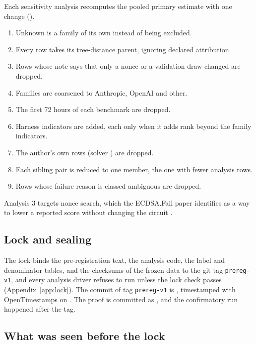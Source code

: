 Each sensitivity analysis recomputes the pooled primary estimate with one change ().
\begin{enumerate}
  \item Unknown is a family of its own instead of being excluded.
  \item Every row takes its tree-distance parent, ignoring declared attribution.
  \item Rows whose note says that only a nonce or a validation draw changed are dropped.
  \item Families are coarsened to Anthropic, OpenAI and other.
  \item The first 72 hours of each benchmark are dropped.
  \item Harness indicators are added, each only when it adds rank beyond the family indicators.
  \item The author's own rows (solver ) are dropped.
  \item Each sibling pair is reduced to one member, the one with fewer analysis rows.
  \item Rows whose failure reason is classed ambiguous are dropped.
\end{enumerate}
Analysis 3 targets nonce search, which the ECDSA.Fail paper identifies as a way to lower a reported score without changing the circuit \citep[\S6]{long2026ecdsafail}.

\subsection{Lock and sealing}
\label{sec:lock}

The lock binds the pre-registration text, the analysis code, the label and denominator tables, and the checksums of the frozen data to the git tag \texttt{prereg-v1}, and every analysis driver refuses to run unless the lock check passes (Appendix~\ref{app:lock}).
The commit of tag \texttt{prereg-v1} is \PreregTag{}, timestamped with OpenTimestamps \citep{opentimestamps} on \PreregOTSDate{}.
The proof is committed as , and the confirmatory run happened after the tag.

\subsection{What was seen before the lock}
\label{sec:peek}

